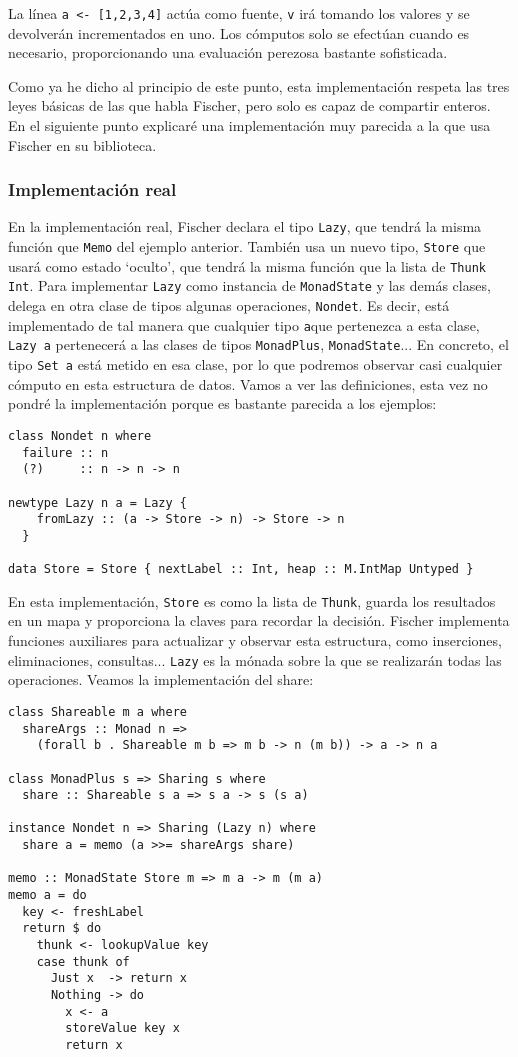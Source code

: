 \documentclass[class=article, crop=false]{standalone}
\begin{document}
La línea \verb`a <- [1,2,3,4]` actúa como fuente, \verb`v` irá tomando los valores y se
devolverán incrementados en uno. Los cómputos solo se efectúan cuando es necesario,
proporcionando una evaluación perezosa bastante sofisticada.

Como ya he dicho al principio de este punto, esta implementación respeta las tres leyes
básicas de las que habla Fischer, pero solo es capaz de compartir enteros. En el siguiente
punto explicaré una implementación muy parecida a la que usa Fischer en su biblioteca.

\subsubsection{Implementación real}
En la implementación real, Fischer declara el tipo \verb`Lazy`, que tendrá la misma función
que \verb`Memo` del ejemplo anterior. También usa un nuevo tipo, \verb`Store` que usará como
estado `oculto', que tendrá la misma función que la lista de \verb`Thunk Int`. Para
implementar \verb`Lazy` como instancia de \verb`MonadState` y las demás clases, delega en
otra clase de tipos algunas operaciones, \verb`Nondet`. Es decir, está implementado de tal
manera que cualquier tipo \verb`a`que pertenezca a esta clase, \verb`Lazy a` pertenecerá a
las clases de tipos \verb`MonadPlus`, \verb`MonadState`... En concreto, el tipo \verb`Set a`
está metido en esa clase, por lo que podremos observar casi cualquier cómputo en esta
estructura de datos. Vamos a ver las definiciones, esta vez no pondré la implementación
porque es bastante parecida a los ejemplos:

\begin{verbatim}
class Nondet n where
  failure :: n
  (?)     :: n -> n -> n

newtype Lazy n a = Lazy {
    fromLazy :: (a -> Store -> n) -> Store -> n
  }

data Store = Store { nextLabel :: Int, heap :: M.IntMap Untyped }
\end{verbatim}

En esta implementación, \verb`Store` es como la lista de \verb`Thunk`, guarda los resultados
en un mapa y proporciona la claves para recordar la decisión. Fischer implementa funciones
auxiliares para actualizar y observar esta estructura, como inserciones, eliminaciones,
consultas... \verb`Lazy` es la mónada sobre la que se realizarán todas las operaciones.
Veamos la implementación del share:

\begin{verbatim}
class Shareable m a where
  shareArgs :: Monad n =>
    (forall b . Shareable m b => m b -> n (m b)) -> a -> n a

class MonadPlus s => Sharing s where
  share :: Shareable s a => s a -> s (s a)

instance Nondet n => Sharing (Lazy n) where
  share a = memo (a >>= shareArgs share)

memo :: MonadState Store m => m a -> m (m a)
memo a = do
  key <- freshLabel
  return $ do
    thunk <- lookupValue key
    case thunk of
      Just x  -> return x
      Nothing -> do
        x <- a
        storeValue key x
        return x
\end{verbatim}
\end{document}
